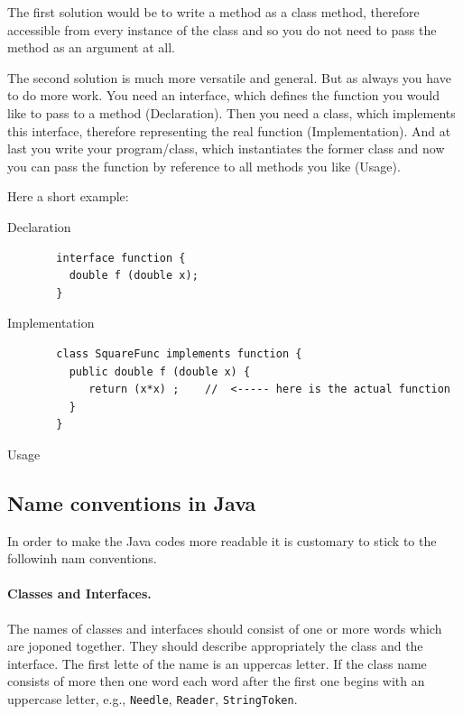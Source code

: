 The first solution would be to write a method as a class method,
therefore accessible from every instance of the class and
so you do not need to pass the method as an argument at all.

The second solution is much more versatile and general.
But as always you have to do more work. You need an interface,
which defines the function you would like to pass to a method
(Declaration). Then you need a class, which implements this
interface, therefore representing the real function (Implementation).
And at last you write your program/class, which instantiates
the former class and now you can pass the function by reference
to all methods you like (Usage).  

Here a short example:
\begin{description}
\item[Declaration]
\begin{verbatim}
  interface function {
    double f (double x); 
  }
\end{verbatim}
\item[Implementation]
\begin{verbatim}
  class SquareFunc implements function {
    public double f (double x) {
       return (x*x) ;    //  <----- here is the actual function
    }
  }
\end{verbatim}
\item[Usage]

\end{description}

\subsection{Name conventions in Java}
In order to make the Java codes more readable it is customary to stick
to the followinh nam conventions.

\paragraph{Classes and Interfaces.} The names of classes and interfaces
  should consist of one or more words which are joponed together. They
  should describe appropriately the class and the interface. 
The first lette of the name is an uppercas letter. If the
  class name consists of more then one word each word after the first
  one begins with an uppercase letter, e.g., \verb|Needle|,
  \verb|Reader|, \verb|StringToken|.


